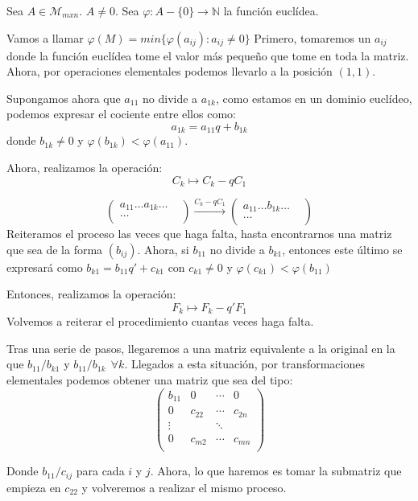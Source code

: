 \documentclass[11pt, a4paper, titlepage]{article}
\providecommand{\nat}{\mathbb{N}}
\theoremstyle{theorem-style}
\theoremstyle{definition-style}
\theoremstyle{remark-style}
\theoremstyle{example-style}
\begin{document}
Sea $A \in \mathcal{M}_{mxn}$. $A \ne 0$. Sea $\varphi:A -\{0\} \to \nat$ la función euclídea.

Vamos a llamar $\varphi(M) = min\{\varphi(a_{ij}) : a_{ij} \ne 0\}$
Primero, tomaremos un $a_{ij}$ donde la función euclídea tome el valor más pequeño que tome en toda la matriz. Ahora, por operaciones elementales podemos llevarlo a la posición $(1,1)$.

Supongamos ahora que $a_{11}$ no divide a $a_{1k}$, como estamos en un dominio euclídeo, podemos expresar el cociente entre ellos como:
\[
a_{1k} = a_{11}q+ b_{1k}
\]
donde $b_{1k} \ne 0$ y $\varphi(b_{1k}) < \varphi(a_{11})$.

Ahora, realizamos la operación:
\[
C_k \mapsto C_k - q C_1
\]

		\[ \begin{pmatrix}
			 a_{11} \hdots  a_{1k} \hdots \\
			   \hdots &  \\
		\end{pmatrix} 
		\xrightarrow{C_k - qC_1}
		\begin{pmatrix}
			 a_{11} \hdots  b_{1k} \hdots \\
			   \hdots &  \\
		\end{pmatrix} 
\]
Reiteramos el proceso las veces que haga falta, hasta encontrarnos una matriz que sea de la forma $(b_{ij})$. Ahora, si $b_{11}$ no divide a $b_{k1}$, entonces este último se expresará como $b_{k1} = b_{11}q' + c_{k1}$ con $c_{k1}\ne 0$ y $\varphi(c_{k1}) < \varphi(b_{11})$

Entonces, realizamos la operación:
\[
F_k \mapsto F_k - q'F_1
\]
Volvemos a reiterar el procedimiento cuantas veces haga falta.

Tras una serie de pasos, llegaremos a una matriz equivalente a la original en la que $b_{11}/b_{k1}$ y $b_{11}/b_{1k} \ \ \forall k$. Llegados a esta situación, por transformaciones elementales podemos obtener una matriz que sea del tipo:
\[
\begin{pmatrix}
 b_{11} & 0 & \cdots & 0 \\
 0 & c_{22} & \cdots & c_{2n} \\
 \vdots &  & \ddots& \\
 0 & c_{m2} & \cdots & c_{mn} \\
\end{pmatrix} 
\]

Donde $b_{11}/ c_{ij}$ para cada $i$ y $j$. Ahora, lo que haremos es tomar la submatriz que empieza en $c_{22}$ y volveremos a realizar el mismo proceso.
\end{document}
